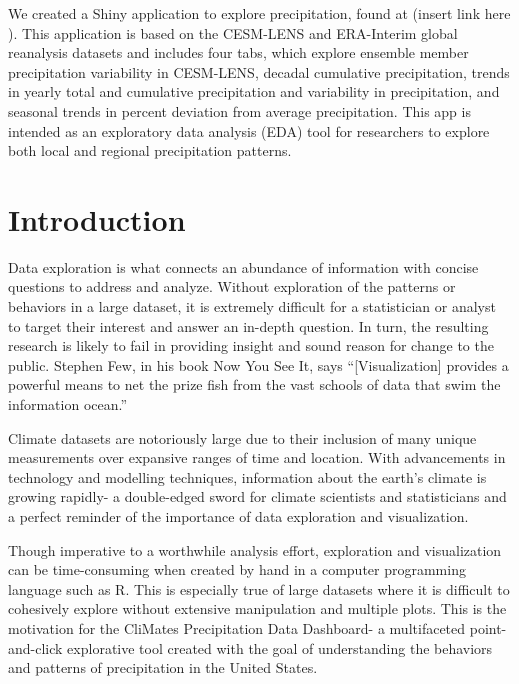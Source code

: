 \documentclass[10pt,letterpaper]{article}
\begin{document}
We created a Shiny application to explore precipitation, found at (insert link here ). This application is based on the CESM-LENS and ERA-Interim global reanalysis datasets and includes four tabs, which explore ensemble member precipitation variability in CESM-LENS, decadal cumulative precipitation, trends in yearly total and cumulative precipitation and variability in precipitation, and seasonal trends in percent deviation from average precipitation. This app is intended as an exploratory data analysis (EDA) tool for researchers to explore both local and regional precipitation patterns.



\linenumbers

\section*{Introduction}

Data exploration is what connects an abundance of information with concise questions to address and analyze. Without exploration of the patterns or behaviors in a large dataset, it is extremely difficult for a statistician or analyst to target their interest and answer an in-depth question. In turn, the resulting research is likely to fail in providing insight and sound reason for change to the public. Stephen Few, in his book Now You See It, says “[Visualization] provides a powerful means to net the prize fish from the vast schools of data that swim the information ocean.” \cite{few_2009}

Climate datasets are notoriously large due to their inclusion of many unique measurements over expansive ranges of time and location. With advancements in technology and modelling techniques, information about the earth’s climate is growing rapidly- a double-edged sword for climate scientists and statisticians and a perfect reminder of the importance of data exploration and visualization.

Though imperative to a worthwhile analysis effort, exploration and visualization can be time-consuming when created by hand in a computer programming language such as R. This is especially true of large datasets where it is difficult to cohesively explore without extensive manipulation and multiple plots. This is the motivation for the CliMates Precipitation Data Dashboard- a multifaceted point-and-click explorative tool created with the goal of understanding the behaviors and patterns of precipitation in the United States.
\end{document}
